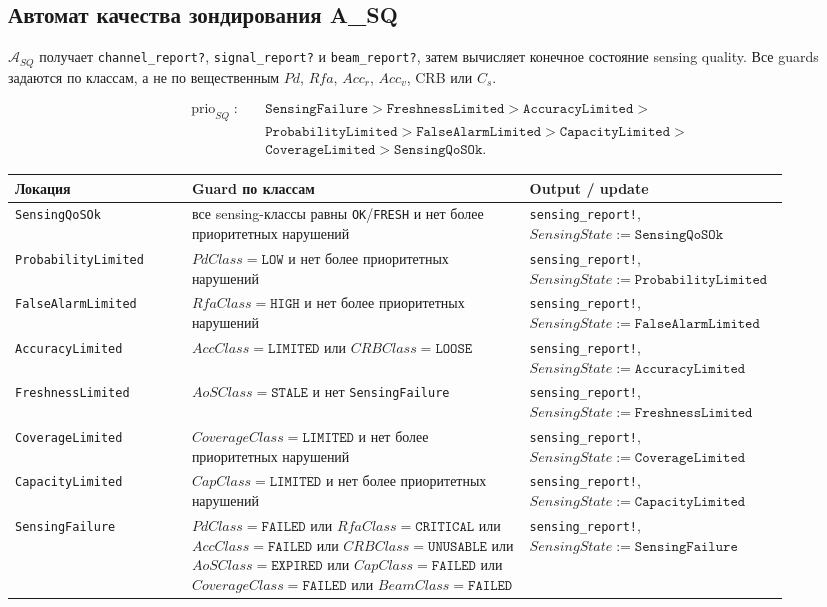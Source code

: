 \documentclass[10pt,a4paper]{article}
\newcommand{\code}[1]{\texttt{#1}}
\newcommand{\A}[1]{\mathcal{A}_{#1}}
\newcommand{\prio}{\operatorname{prio}}
\begin{document}
\subsection{Автомат качества зондирования A\_SQ}

\(\A{SQ}\) получает \code{channel\_report?}, \code{signal\_report?} и \code{beam\_report?}, затем вычисляет конечное состояние sensing quality. Все guards задаются по классам, а не по вещественным \(Pd\), \(Rfa\), \(Acc_r\), \(Acc_v\), CRB или \(C_s\).

\begin{equation}
\begin{aligned}
\prio_{SQ}:\quad &\code{SensingFailure}>\code{FreshnessLimited}>\code{AccuracyLimited}>\\
&\code{ProbabilityLimited}>\code{FalseAlarmLimited}>\code{CapacityLimited}>\\
&\code{CoverageLimited}>\code{SensingQoSOk}.
\end{aligned}
\end{equation}

\begin{longtable}{|p{0.22\linewidth}|p{0.42\linewidth}|p{0.26\linewidth}|}
\hline
Локация & Guard по классам & Output / update \\
\hline
\code{SensingQoSOk} & все sensing-классы равны \code{OK}/\code{FRESH} и нет более приоритетных нарушений & \code{sensing\_report!}, \(SensingState:=\code{SensingQoSOk}\) \\
\hline
\code{ProbabilityLimited} & \(PdClass=\code{LOW}\) и нет более приоритетных нарушений & \code{sensing\_report!}, \(SensingState:=\code{ProbabilityLimited}\) \\
\hline
\code{FalseAlarmLimited} & \(RfaClass=\code{HIGH}\) и нет более приоритетных нарушений & \code{sensing\_report!}, \(SensingState:=\code{FalseAlarmLimited}\) \\
\hline
\code{AccuracyLimited} & \(AccClass=\code{LIMITED}\) или \(CRBClass=\code{LOOSE}\) & \code{sensing\_report!}, \(SensingState:=\code{AccuracyLimited}\) \\
\hline
\code{FreshnessLimited} & \(AoSClass=\code{STALE}\) и нет \code{SensingFailure} & \code{sensing\_report!}, \(SensingState:=\code{FreshnessLimited}\) \\
\hline
\code{CoverageLimited} & \(CoverageClass=\code{LIMITED}\) и нет более приоритетных нарушений & \code{sensing\_report!}, \(SensingState:=\code{CoverageLimited}\) \\
\hline
\code{CapacityLimited} & \(CapClass=\code{LIMITED}\) и нет более приоритетных нарушений & \code{sensing\_report!}, \(SensingState:=\code{CapacityLimited}\) \\
\hline
\code{SensingFailure} & \(PdClass=\code{FAILED}\) или \(RfaClass=\code{CRITICAL}\) или \(AccClass=\code{FAILED}\) или \(CRBClass=\code{UNUSABLE}\) или \(AoSClass=\code{EXPIRED}\) или \(CapClass=\code{FAILED}\) или \(CoverageClass=\code{FAILED}\) или \(BeamClass=\code{FAILED}\) & \code{sensing\_report!}, \(SensingState:=\code{SensingFailure}\) \\
\hline
\end{longtable}
\end{document}
